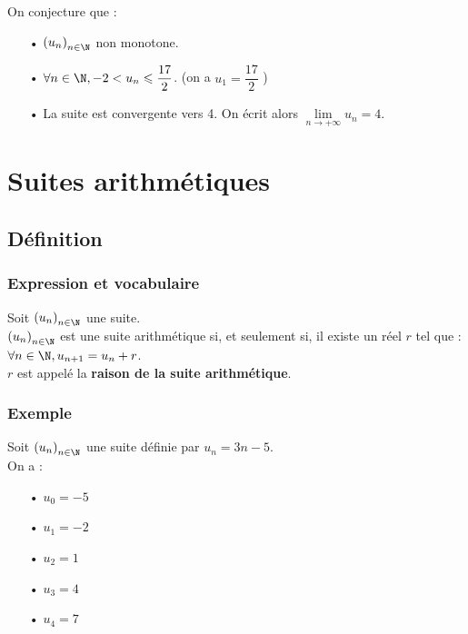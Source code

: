 \vspace*{.5cm}

On conjecture que  :
\begin{itemize}
\item[•] $\left(u_n\right)_{n \in \N}$ non monotone.
\item[•] $\forall n \in \N, -2 < u_n \leqslant \dfrac{17}{2}$. (on a $u_1 = \dfrac{17}{2}$ )
\item[•] La suite est convergente vers 4. On écrit alors $\lim\limits_{n \to +\infty} u_n = 4$. 
\end{itemize}

\newpage

\section{Suites arithmétiques}

\subsection{Définition}

\subsubsection{Expression et vocabulaire}

Soit $\left(u_n\right)_{n \in \N}$ une suite. \\

$\left(u_n\right)_{n \in \N}$ est une suite arithmétique si, et seulement si, il existe un réel $r$ tel que : \\
$\forall n \in \N, u_{n+1} = u_n + r$. \\

$r$ est appelé la \textbf{raison de la suite arithmétique}. 

\subsubsection{Exemple}
Soit $\left(u_n\right)_{n \in \N}$ une suite définie par $u_n = 3n - 5$. \\

On a : 

\begin{itemize}
\item[•] $u_0 = -5$
\item[•] $u_1 = -2$
\item[•] $u_2 = 1$
\item[•] $u_3 = 4$
\item[•] $u_4 = 7$
\end{itemize}

